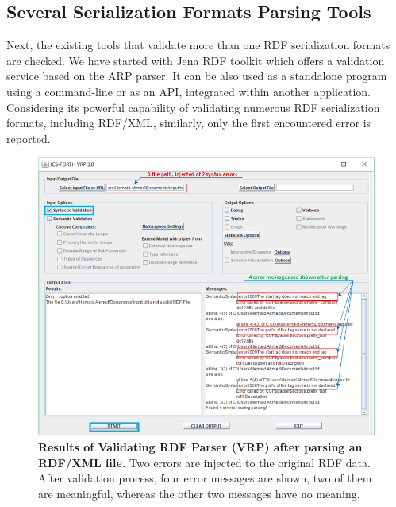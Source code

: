 \subsection{Several Serialization Formats Parsing Tools}

\par Next, the existing tools that validate more than one RDF serialization formats are checked. 
We have started with Jena RDF toolkit \cite{McBride:2002:JSW:613357.613755} which offers a validation service based on the ARP parser. 
It can be also used as a standalone program using a command-line or as an API, integrated within another application.
Considering its powerful capability of validating numerous RDF serialization formats, including RDF/XML, similarly, only the first encountered error is reported.

 \begin{figure}[ht]
		\begin{center}
			\includegraphics[scale=0.7,angle=0]{images/VRPErrorResult.png}
			\caption{\textbf{Results of Validating RDF Parser (VRP) \cite{karsten:Thesis:2000} after parsing an RDF/XML file.} Two errors are injected to the original RDF data. After validation process, four error messages are shown, two of them are meaningful, whereas the other two messages have no meaning.}
			\label{Fig:VRPErrorResult}
		\end{center}
	\end{figure}
	
\vspace*{-\baselineskip}

